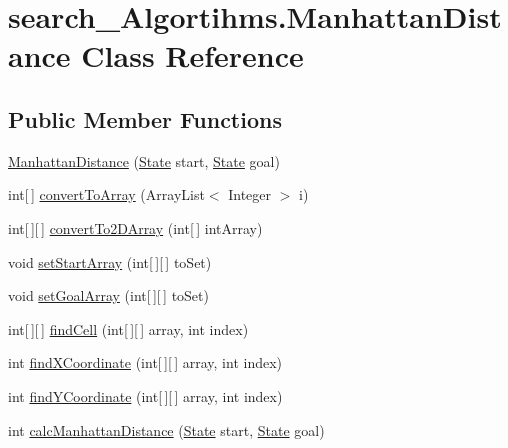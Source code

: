 \hypertarget{classsearch___algortihms_1_1_manhattan_distance}{\section{search\+\_\+\+Algortihms.\+Manhattan\+Distance Class Reference}
\label{classsearch___algortihms_1_1_manhattan_distance}
}
\subsection*{Public Member Functions}
\begin{DoxyCompactItemize}
\item 
\hyperlink{classsearch___algortihms_1_1_manhattan_distance_a0e9b3cff185dbdbcdfbe5131cfd87aee}{Manhattan\+Distance} (\hyperlink{classcsm6120__assignment2_1_1_state}{State} start, \hyperlink{classcsm6120__assignment2_1_1_state}{State} goal)
\item 
int\mbox{[}$\,$\mbox{]} \hyperlink{classsearch___algortihms_1_1_manhattan_distance_a51a014acf1ed4e7e466d563d8a72d55f}{convert\+To\+Array} (Array\+List$<$ Integer $>$ i)
\item 
int\mbox{[}$\,$\mbox{]}\mbox{[}$\,$\mbox{]} \hyperlink{classsearch___algortihms_1_1_manhattan_distance_a532861e180e29a986007879f79d1ef8f}{convert\+To2\+D\+Array} (int\mbox{[}$\,$\mbox{]} int\+Array)
\item 
void \hyperlink{classsearch___algortihms_1_1_manhattan_distance_a697e6d3bfef9a84d680495d65320a588}{set\+Start\+Array} (int\mbox{[}$\,$\mbox{]}\mbox{[}$\,$\mbox{]} to\+Set)
\item 
void \hyperlink{classsearch___algortihms_1_1_manhattan_distance_a601fce5e610f41846300f9cef7706b64}{set\+Goal\+Array} (int\mbox{[}$\,$\mbox{]}\mbox{[}$\,$\mbox{]} to\+Set)
\item 
int\mbox{[}$\,$\mbox{]}\mbox{[}$\,$\mbox{]} \hyperlink{classsearch___algortihms_1_1_manhattan_distance_af0d928279519afdf7019f7a5a001e3fb}{find\+Cell} (int\mbox{[}$\,$\mbox{]}\mbox{[}$\,$\mbox{]} array, int index)
\item 
int \hyperlink{classsearch___algortihms_1_1_manhattan_distance_a7dcf33a2ce3bc818dc1ce2ba2e038264}{find\+X\+Coordinate} (int\mbox{[}$\,$\mbox{]}\mbox{[}$\,$\mbox{]} array, int index)
\item 
int \hyperlink{classsearch___algortihms_1_1_manhattan_distance_ac7f0b3bfd527b26c51316e6d88bc5d7b}{find\+Y\+Coordinate} (int\mbox{[}$\,$\mbox{]}\mbox{[}$\,$\mbox{]} array, int index)
\item 
int \hyperlink{classsearch___algortihms_1_1_manhattan_distance_a4b210884175e074de705a946cf485863}{calc\+Manhattan\+Distance} (\hyperlink{classcsm6120__assignment2_1_1_state}{State} start, \hyperlink{classcsm6120__assignment2_1_1_state}{State} goal)
\end{DoxyCompactItemize}


